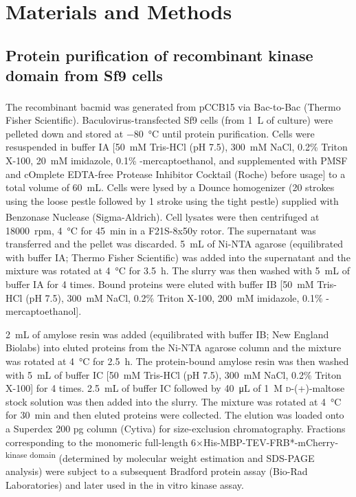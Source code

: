\section{Materials and Methods}
\subsection*{Protein purification of recombinant  kinase domain from Sf9 cells}
The recombinant bacmid was generated from pCCB15 via Bac-to-Bac\textsuperscript{\textregistered} (Thermo Fisher Scientific). Baculovirus-transfected Sf9 cells (from \SI{1}{L} of culture) were pelleted down and stored at \SI{-80}{\celsius} until protein purification. Cells were resuspended in buffer IA [\SI{50}{mM} Tris-HCl (pH 7.5), \SI{300}{mM} NaCl, 0.2\% Triton X-100, \SI{20}{mM} imidazole, 0.1\% \textbeta-mercaptoethanol, and supplemented with PMSF and cOmplete\texttrademark{} EDTA-free Protease Inhibitor Cocktail (Roche) before usage] to a total volume of \SI{60}{mL}. Cells were lysed by a Dounce homogenizer (20 strokes using the loose pestle followed by 1 stroke using the tight pestle) supplied with Benzonase\textsuperscript{\textregistered} Nuclease (Sigma-Aldrich). Cell lysates were then centrifuged at \SI{18000}{rpm}, \SI{4}{\celsius} for \SI{45}{min} in a F21S-8x50y rotor. The supernatant was transferred and the pellet was discarded. \SI{5}{mL} of Ni-NTA agarose (equilibrated with buffer IA; Thermo Fisher Scientific) was added into the supernatant and the mixture was rotated at \SI{4}{\celsius} for \SI{3.5}{h}. The slurry was then washed with \SI{5}{mL} of buffer IA for 4 times. Bound proteins were eluted with buffer IB [\SI{50}{mM} Tris-HCl (pH 7.5), \SI{300}{mM} NaCl, 0.2\% Triton X-100, \SI{200}{mM} imidazole, 0.1\% \textbeta-mercaptoethanol].

\SI{2}{mL} of amylose resin was added (equilibrated with buffer IB; New England Biolabs) into eluted proteins from the Ni-NTA agarose column and the mixture was rotated at \SI{4}{\celsius} for \SI{2.5}{h}. The protein-bound amylose resin was then washed with \SI{5}{mL} of buffer IC [\SI{50}{mM} Tris-HCl (pH 7.5), \SI{300}{mM} NaCl, 0.2\% Triton X-100] for 4 times. \SI{2.5}{mL} of buffer IC followed by \SI{40}{\micro L} of \SI{1}{M} \textsc{d}-(+)-maltose stock solution was then added into the slurry. The mixture was rotated at \SI{4}{\celsius} for \SI{30}{min} and then eluted proteins were collected. The elution was loaded onto a Superdex 200 pg column (Cytiva) for size-exclusion chromatography. Fractions corresponding to the monomeric full-length 6×His-MBP-TEV-FRB*-mCherry-\textsuperscript{kinase domain} (determined by molecular weight estimation and SDS-PAGE analysis) were subject to a subsequent Bradford protein assay (Bio-Rad Laboratories) and later used in the in vitro kinase assay.

